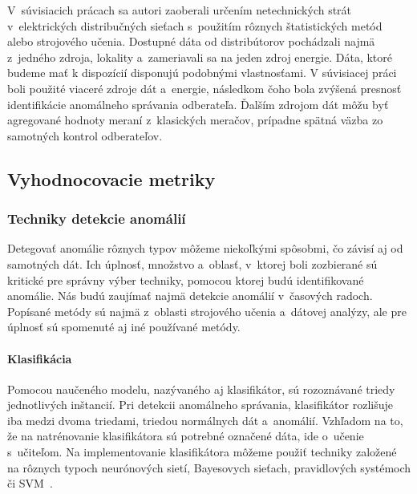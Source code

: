 \documentclass[a4paper,twoside,slovak,12pt]{article}
\begin{document}
V~súvisiacich prácach sa autori zaoberali určením netechnických strát
v~elektrických distribučných sieťach s~použitím rôznych štatistických metód
alebo strojového učenia. Dostupné dáta od distribútorov pochádzali najmä
z~jedného zdroja, lokality a~zameriavali sa na jeden zdroj energie. Dáta, ktoré
budeme mať k dispozícií disponujú podobnými vlastnosťami. V súvisiacej
práci~\cite{Coma-Puig2016} boli použité viaceré zdroje dát a~energie, následkom
čoho bola zvýšená presnosť identifikácie anomálneho správania odberateľa.
Ďalším zdrojom dát môžu byť agregované hodnoty meraní z~klasických meračov,
prípadne spätná väzba zo samotných kontrol odberateľov.


\subsection{Vyhodnocovacie metriky}


\subsubsection{Techniky detekcie anomálií}
Detegovať anomálie rôznych typov môžeme niekoľkými spôsobmi, čo závisí aj od
samotných dát. Ich úplnosť, množstvo a~oblasť, v~ktorej boli zozbierané sú
kritické pre správny výber techniky, pomocou ktorej budú identifikované anomálie.
Nás budú zaujímať najmä detekcie anomálií v~časových radoch. Popísané metódy
sú najmä z~oblasti strojového učenia a~dátovej analýzy, ale pre úplnosť sú
spomenuté aj iné používané metódy.

\paragraph{Klasifikácia}
Pomocou naučeného modelu, nazývaného aj klasifikátor, sú rozoznávané triedy
jednotlivých inštancií. Pri detekcii anomálneho správania, klasifikátor rozlišuje
iba medzi dvoma triedami, triedou normálnych dát a~anomálií. Vzhľadom na to, že
na natrénovanie klasifikátora sú potrebné označené dáta, ide o~učenie s~učiteľom.
Na implementovanie klasifikátora môžeme použiť techniky založené na rôznych
typoch neurónových sietí, Bayesovych sieťach, pravidlových systémoch či
SVM~\cite{Chandola2009,Tan2005}.
\end{document}
